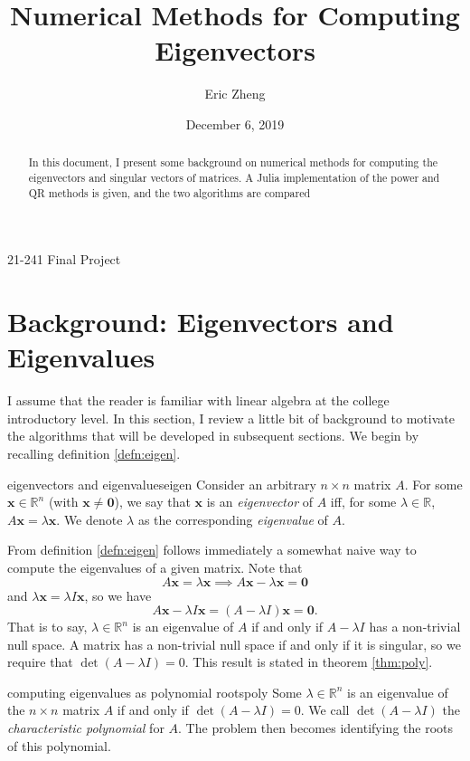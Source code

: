 \documentclass{article}
\title{Numerical Methods for Computing Eigenvectors}
\author{Eric Zheng}
\date{December 6, 2019}
\makeatletter
\renewcommand{\maketitle}{
  \begin{center}
  {\vspace*{10mm}\LARGE\@title\par}
  {\vspace{7mm}\large\@author\par}
  {\vspace{1mm}21-241 Final Project\par}
  {\vspace{3mm}\large\@date\vspace{8mm}}
  \end{center}
}
\let\vec\mathbf
\makeatother
\begin{document}
\maketitle

\begin{abstract}
  In this document, I present some background on numerical methods for computing
  the eigenvectors and singular vectors of matrices. A Julia implementation of
  the power and QR methods is given, and the two algorithms are compared
\end{abstract}

\tableofcontents

\section{Background: Eigenvectors and Eigenvalues}
I assume that the reader is familiar with linear algebra at the college introductory level. In this section, I review a little bit of background to motivate the algorithms that will be developed in subsequent sections. We begin by recalling definition \ref{defn:eigen}.

\begin{definition}{eigenvectors and eigenvalues}{eigen}
  Consider an arbitrary $n \times n$ matrix $A$. For some $\vec{x} \in \mathbb{R}^n$ (with $\vec{x} \neq \vec{0}$), we say that $\vec{x}$ is an \textit{eigenvector} of $A$ iff, for some $\lambda \in \mathbb{R}$, $A\vec{x} = \lambda\vec{x}$. We denote $\lambda$ as the corresponding \textit{eigenvalue} of $A$.
\end{definition}

From definition \ref{defn:eigen} follows immediately a somewhat naive way to compute the eigenvalues of a given matrix. Note that
\begin{equation*}
  A\vec{x} = \lambda\vec{x} \implies A\vec{x} - \lambda\vec{x} = \vec{0}
\end{equation*}
and $\lambda\vec{x} = \lambda I \vec{x}$, so we have
\begin{equation*}
  A\vec{x} - \lambda I \vec{x} = (A - \lambda I)\vec{x} = \vec{0}.
\end{equation*}
That is to say, $\lambda \in \mathbb{R}^n$ is an eigenvalue of $A$ if and only if $A - \lambda I$ has a non-trivial null space. A matrix has a non-trivial null space if and only if it is singular, so we require that $\det(A - \lambda I) = 0$. This result is stated in theorem \ref{thm:poly}.

\begin{theorem}{computing eigenvalues as polynomial roots}{poly}
  Some $\lambda \in \mathbb{R}^n$ is an eigenvalue of the $n \times n$ matrix $A$ if and only if $\det (A - \lambda I) = 0$. We call $\det (A - \lambda I)$ the \textit{characteristic polynomial} for $A$. The problem then becomes identifying the roots of this polynomial.
\end{theorem}
\end{document}
